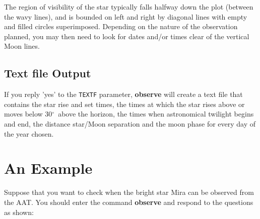 \documentclass[11pt,noabs]{starlink}
\providecommand{\degrees}{\hbox{$^\circ$}}
\begin{document}
The region of visibility of the star typically falls halfway down the
plot (between the wavy lines), and is bounded on left and right by
diagonal lines with empty and filled  circles superimposed. Depending
on the nature of the observation planned, you may then need  to look
for  dates and/or times clear of the vertical Moon lines.

\subsection{Text file Output}

If you reply 'yes' to the {\tt{TEXTF}} parameter, {\bf{observe}} will
create a text file that contains the star rise and set times, the times
at which the star rises above or moves below 30\degrees\ above the
horizon, the times when astronomical twilight begins and end, the
distance star/Moon separation and the moon phase for every day of the
year chosen.

\newpage
\section{An Example}

Suppose that you want to check when the bright star Mira can be
observed  from the AAT.  You should enter the command {\bf{observe}} and
respond to the questions as  shown:
\end{document}

